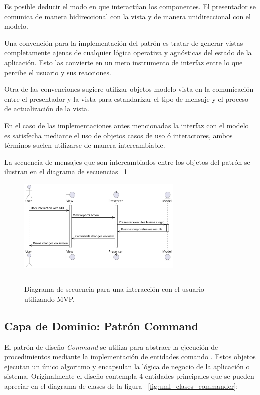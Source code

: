Es posible deducir el modo en que interactúan los componentes. El presentador se comunica de manera bidireccional con la vista y de manera unidireccional con el modelo.

Una convención para la implementación del patrón es tratar de generar vistas completamente ajenas de cualquier lógica operativa y agnósticas del estado de la aplicación. Esto las convierte en un mero instrumento de interfaz entre lo que percibe el usuario y sus reacciones. 

Otra de las convenciones sugiere utilizar objetos modelo-vista en la comunicación entre el presentador y la vista para estandarizar el tipo de mensaje y el proceso de actualización de la vista.

En el caso de las implementaciones antes mencionadas la interfaz con el modelo es satisfecha mediante el uso de objetos casos de uso ó interactores, ambos términos suelen utilizarse de manera intercambiable.

La secuencia de mensajes que son intercambiados entre los objetos del patrón se ilustran en el diagrama de secuencias ~\ref{fig:uml_mvp_sequence}

\begin{figure}[htbp]
	\centering
	\includegraphics[width=0.7\textwidth]{Figures/design/SEQ_mvp.png}
	\rule{35em}{1pt}
	\caption[MVP Sequence]{Diagrama de secuencia para una interacción con el usuario utilizando MVP.}
	\label{fig:uml_mvp_sequence}
\end{figure}


\subsection{Capa de Dominio: Patrón Command}
El patrón de diseño \emph{Command} se utiliza para abstraer la ejecución de procedimientos mediante la implementación de entidades comando \cite{comm_sugrue}. Estos objetos ejecutan un único algoritmo y encapsulan la lógica de negocio de la aplicación o sistema.
Originalmente el diseño contempla 4 entidades principales que se pueden apreciar en el diagrama de clases de la figura ~\ref{fig:uml_clases_commander}:

